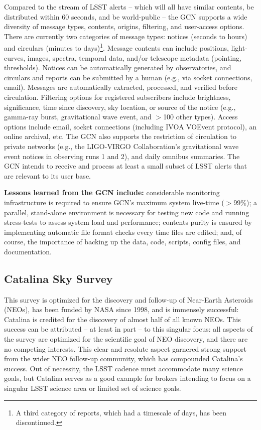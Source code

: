 Compared to the stream of LSST alerts -- which will all have similar contents, be distributed within 60 seconds, and be world-public -- the GCN supports a wide diversity of message types, contents, origins, filtering, and user-access options.
There are currently two categories of message types: notices (seconds to hours) and circulars (minutes to days)\footnote{A third category of reports, which had a timescale of days, has been discontinued.}.
Message contents can include positions, light-curves, images, spectra, temporal data, and/or telescope metadata (pointing, thresholds).
Notices can be automatically generated by observatories, and circulars and reports can be submitted by a human (e.g., via socket connections, email).
Messages are automatically extracted, processed, and verified before circulation.
Filtering options for registered subscribers include brightness, significance, time since discovery, sky location, or source of the notice (e.g., gamma-ray burst, gravitational wave event, and $>$100 other types).
Access options include email, socket connections (including IVOA VOEvent protocol), an online archival, etc.
The GCN also supports the restriction of circulation to private networks (e.g., the LIGO-VIRGO Collaboration's gravitational wave event notices in observing runs 1 and 2), and daily omnibus summaries.
The GCN intends to receive and process at least a small subset of LSST alerts that are relevant to its user base. 

{\bf Lessons learned from the GCN include:}
considerable monitoring infrastructure is required to ensure GCN's maximum system live-time ($>$99\%);
a parallel, stand-alone environment is necessary for testing new code and running stress-tests to assess system load and performance;
contents purity is ensured by implementing automatic file format checks every time files are edited;
and, of course, the importance of backing up the data, code, scripts, config files, and documentation.

\subsection{Catalina Sky Survey}

This survey is optimized for the discovery and follow-up of Near-Earth Asteroids (NEOs), has been funded by NASA since 1998, and is immensely successful: Catalina is credited for the discovery of almost half of all known NEOs.
This success can be attributed -- at least in part -- to this singular focus: all aspects of the survey are optimized for the scientific goal of NEO discovery, and there are no competing interests.
This clear and resolute aspect garnered strong support from the wider NEO follow-up community, which has compounded Catalina's success.
Out of necessity, the LSST cadence must accommodate many science goals, but Catalina serves as a good example for brokers intending to focus on a singular LSST science area or limited set of science goals. 

